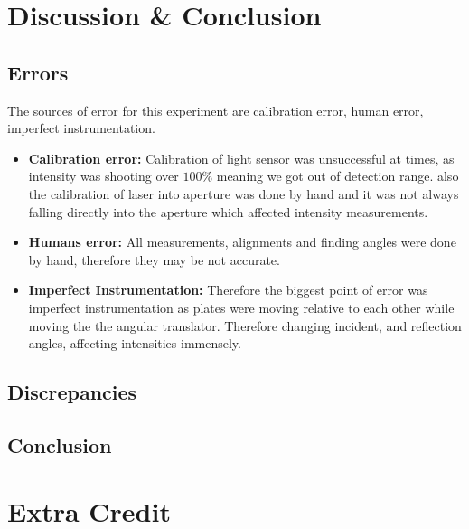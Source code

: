 \documentclass[10pt]{article}
\begin{document}
\section{Discussion \& Conclusion}

\subsection*{Errors}
The sources of error for this experiment are calibration error, human error, imperfect instrumentation.
\begin{itemize}
  \item \textbf{Calibration error:} Calibration of light sensor was unsuccessful at times, as intensity was shooting over $100\%$ meaning we got out of detection range. also the calibration of laser into aperture was done by hand and it was not always falling directly into the aperture which affected intensity measurements.
  \item \textbf{Humans error:} All measurements, alignments and finding angles were done by hand, therefore they may be not accurate.
  \item \textbf{Imperfect Instrumentation:} Therefore the biggest point of error was imperfect instrumentation as plates were moving relative to each other while moving the the angular translator. Therefore changing incident, and reflection angles, affecting intensities immensely. 
\end{itemize}

\subsection*{Discrepancies}

\subsection*{Conclusion} 

\section{Extra Credit}

\printbibliography
\end{document}

